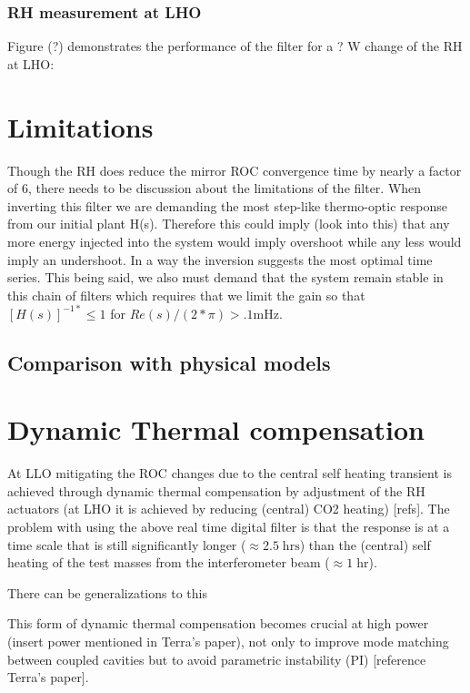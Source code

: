 \documentclass[colorlinks=true,pdfstartview=FitV,linkcolor=blue,
            citecolor=magenta,urlcolor=red]{ligodoc}
\begin{document}
\subsubsection{RH measurement at LHO}
Figure (?) demonstrates the performance of the filter for a ? W change of the RH at LHO:



\section{Limitations}
Though the RH does reduce the mirror ROC convergence time by nearly a factor of 6, there needs to be discussion about the limitations of the filter. When inverting this filter we are demanding the most step-like thermo-optic response from our initial plant H(s). Therefore this could imply (look into this) that any more energy injected into the system would imply overshoot while any less would imply an undershoot. In a way the inversion suggests the most optimal time series.  This being said, we also must demand that the system remain stable in this chain of filters which requires that we limit the gain so that $[H(s)]^{-1*} \leq 1$ for $Re(s)/(2*\pi)>.1 \mathrm{mHz}$.
\subsection{Comparison with physical models}


\section{Dynamic Thermal compensation}
At LLO mitigating the ROC changes due to the central self heating transient is achieved through dynamic thermal compensation by adjustment of the RH actuators (at LHO it is achieved by reducing (central) CO2 heating) [refs]. The problem with using the above real time digital filter is that the response is at a time scale that is still significantly longer ($\approx 2.5\;\mathrm{hrs}$) than the (central) self heating of the test masses from the interferometer beam ($\approx 1\; \mathrm{hr}$).

There can be generalizations to this

This form of dynamic thermal compensation becomes crucial at high power (insert power mentioned in Terra's paper), not only to improve mode matching between coupled cavities but to avoid parametric instability (PI) [reference Terra's paper].




\begin{thebibliography}{99}


\end{thebibliography}

\newpage
\end{document}
